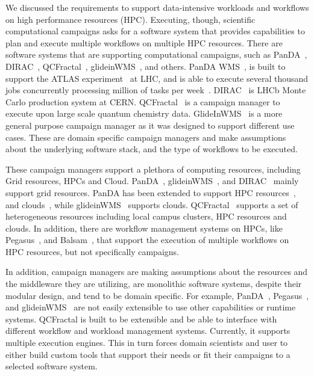 \label{ch:cmanager}

We discussed the requirements to support data-intensive workloads and workflows on high performance resources (HPC).
Executing, though, scientific computational campaigns asks for a software system that provides capabilities to plan and execute multiple workflows on multiple HPC resources.
There are software systems that are supporting computational campaigns, such as PanDA~\cite{maeno2008panda}, DIRAC~\cite{casajus2010dirac}, QCFractal~\cite{qcfractal}, glideinWMS~\cite{sfiligoi2008glidein}, and others. 
PanDA WMS~\cite{maeno2008panda}, is built to support the ATLAS experiment~\cite{atlas} at LHC, and is able to execute several thousand jobs concurrently processing million of tasks per week~\cite{de2015future}.
DIRAC~\cite{tsaregorodtsev2003dirac} is LHCb Monte Carlo production system at CERN.
QCFractal~\cite{qcfractal} is a campaign manager to execute upon large scale quantum chemistry data.
GlideInWMS~\cite{sfiligoi2008glidein} is a more general purpose campaign manager as it was designed to support different use cases.
These are domain specific campaign managers and make assumptions about the underlying software stack, and the type of workflows to be executed.

These campaign managers support a plethora of computing resources, including Grid resources, HPCs and Cloud.
PanDA~\cite{maeno2008panda}, glideinWMS~\cite{sfiligoi2008glidein}, and DIRAC~\cite{casajus2010dirac} mainly support grid resources.
PanDA has been extended to support HPC resources~\cite{de2015future, de2016accelerating}, and clouds~\cite{de2016accelerating}, while glideinWMS~\cite{sfiligoi2008glidein} supports clouds.
QCFractal~\cite{qcfractal} supports a set of heterogeneous resources including local campus clusters, HPC resources and clouds.
In addition, there are workflow management systems on HPCs, like Pegasus~\cite{deelman2015pegasus}, and Balsam~\cite{salim2019balsam}, that support the execution of multiple workflows on HPC resources, but not specifically campaigns.

In addition, campaign managers are making assumptions about the resources and the middleware they are utilizing, are monolithic software systems, despite their modular design, and tend to be domain specific.
For example, PanDA~\cite{maeno2008panda}, Pegasus~\cite{deelman2015pegasus}, and glideinWMS~\cite{sfiligoi2008glidein} are not easily extensible to use other capabilities or runtime systems.
QCFractal is built to be extensible and be able to interface with different workflow and workload management systems. Currently, it supports multiple execution engines.
This in turn forces domain scientists and user to either build custom tools that support their needs or fit their campaigns to a selected software system.

